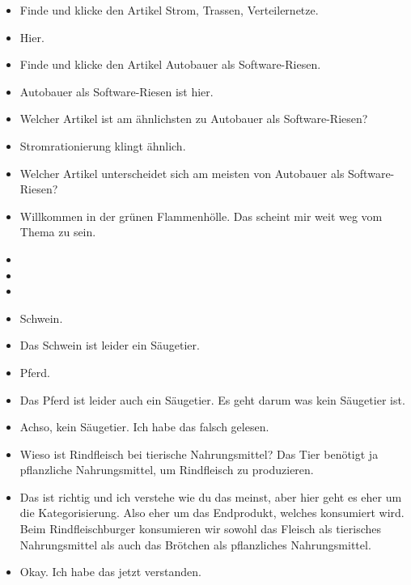 {\begin{itemize}[]
            \item {} Finde und klicke den Artikel \flqq Strom, Trassen, Verteilernetze\frqq{}.
            \item {} Hier.
            \item {} Finde und klicke den Artikel \flqq Autobauer als Software-Riesen\frqq{}.
            \item {} \flqq Autobauer als Software-Riesen\frqq{} ist hier.
            \item {} Welcher Artikel ist am ähnlichsten zu \flqq Autobauer als Software-Riesen\frqq{}?
            \item {} \flqq Stromrationierung\frqq{} klingt ähnlich.
            \item {} Welcher Artikel unterscheidet sich am meisten von \flqq Autobauer als Software-Riesen\frqq{}?
            \item {} \flqq Willkommen in der grünen Flammenhölle\frqq{}. Das scheint mir weit weg vom Thema zu sein.
            \item {}
            \item {}
            \item {}
            \item {} Schwein.
            \item {} Das Schwein ist leider ein Säugetier.
            \item {} Pferd.
            \item {} Das Pferd ist leider auch ein Säugetier. Es geht darum was kein Säugetier ist.
            \item {} Achso, kein Säugetier. Ich habe das falsch gelesen.
            \item {} Wieso ist Rindfleisch bei tierische Nahrungsmittel?
                  Das Tier benötigt ja pflanzliche Nahrungsmittel, um Rindfleisch zu produzieren.
            \item {} Das ist richtig und ich verstehe wie du das meinst, aber hier geht es eher um die Kategorisierung.
                  Also eher um das Endprodukt, welches konsumiert wird.
                  Beim Rindfleischburger konsumieren wir sowohl das Fleisch als tierisches Nahrungsmittel als auch das Brötchen als pflanzliches Nahrungsmittel.
            \item {} Okay. Ich habe das jetzt verstanden.

\end{itemize}}
